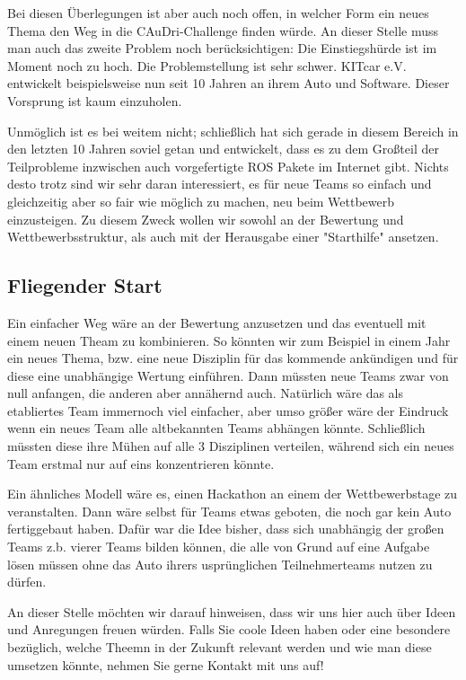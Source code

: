 Bei diesen Überlegungen ist aber auch noch offen, in welcher Form ein neues
Thema den Weg in die CAuDri-Challenge finden würde. 
An dieser Stelle muss man auch das zweite Problem noch berücksichtigen:
Die Einstiegshürde ist im Moment noch zu hoch.
Die Problemstellung ist sehr schwer. KITcar e.V. entwickelt beispielsweise
nun seit 10 Jahren an ihrem Auto und Software.
Dieser Vorsprung ist kaum einzuholen.

Unmöglich ist es bei weitem nicht; schließlich hat sich gerade in diesem
Bereich in den letzten 10 Jahren soviel getan und entwickelt, dass 
es zu dem Großteil der Teilprobleme inzwischen auch vorgefertigte 
ROS Pakete im Internet gibt. 
Nichts desto trotz sind wir sehr daran interessiert, es für neue Teams
so einfach und gleichzeitig aber so fair wie möglich zu machen, neu 
beim Wettbewerb einzusteigen. 
Zu diesem Zweck wollen wir sowohl an der Bewertung und Wettbewerbsstruktur,
als auch mit der Herausgabe einer "Starthilfe" ansetzen.

\subsection{Fliegender Start}
Ein einfacher Weg wäre an der Bewertung anzusetzen und das eventuell mit 
einem neuen Theam zu kombinieren.
So könnten wir zum Beispiel in einem Jahr 
ein neues Thema, bzw. eine neue Disziplin für das kommende ankündigen und für
diese eine unabhängige Wertung einführen.
Dann müssten neue Teams zwar von null anfangen, die anderen aber annähernd auch.
Natürlich wäre das als etabliertes Team immernoch viel einfacher, aber umso
größer wäre der Eindruck wenn ein neues Team alle altbekannten Teams abhängen könnte.
Schließlich müssten diese ihre Mühen auf alle 3 Disziplinen verteilen, während
sich ein neues Team erstmal nur auf eins konzentrieren könnte.

Ein ähnliches Modell wäre es, einen Hackathon an einem der Wettbewerbstage zu 
veranstalten. Dann wäre selbst für Teams etwas geboten, die noch gar kein Auto
fertiggebaut haben. Dafür war die Idee bisher, dass sich unabhängig der großen Teams
z.b. vierer Teams bilden können, die alle von Grund auf eine Aufgabe lösen müssen
ohne das Auto ihrers usprünglichen Teilnehmerteams nutzen zu dürfen.

An dieser Stelle möchten wir darauf hinweisen, dass wir uns hier auch über Ideen
und Anregungen freuen würden. 
Falls Sie coole Ideen haben oder eine besondere 
bezüglich, welche Theemn in der Zukunft relevant werden und wie man diese umsetzen könnte,
nehmen Sie gerne Kontakt mit uns auf!

